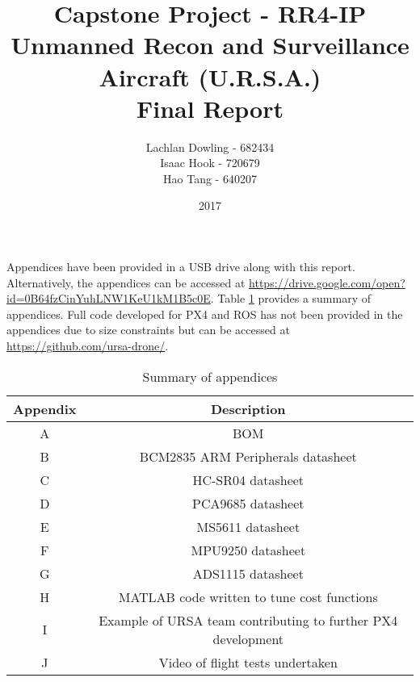 \documentclass[12pt]{report}
\title{Capstone Project - RR4-IP \\Unmanned Recon and Surveillance Aircraft (U.R.S.A.) \\ \Huge Final Report}
\author{\large Lachlan Dowling - 682434 \\ Isaac Hook - 720679 \\ Hao Tang - 640207 }
\date{2017}
\begin{document}

\thispagestyle{empty}
    \maketitle
    \thispagestyle{empty}
    
    \newpage

    \clearpage
    \setcounter{page}{1}


\tableofcontents









{}


\appendix
\appendixpage
Appendices have been provided in a USB drive along with this report. Alternatively, the appendices can be accessed at \url{https://drive.google.com/open?id=0B64fzCinYuhLNW1KeU1kM1B5c0E}. Table \ref{tab:apptable} provides a summary of appendices. Full code developed for PX4 and ROS has not been provided in the appendices due to size constraints but can be accessed at \url{https://github.com/ursa-drone/}.

\begin{table}[H]
\centering
    \begin{tabular}{|c|c|}
        \hline
        Appendix & Description\\
        \hline
        A & BOM \\
        B & BCM2835 ARM Peripherals datasheet\\
        C & HC-SR04 datasheet\\
        D & PCA9685 datasheet\\
        E & MS5611 datasheet\\
        F & MPU9250 datasheet\\
        G & ADS1115 datasheet\\
        H & MATLAB code written to tune cost functions\\
        I & Example of URSA team contributing to further PX4 development\\
        J & Video of flight tests undertaken\\
        \hline
    \end{tabular}
\caption{Summary of appendices \label{tab:apptable}}
\end{table}
\end{document}
